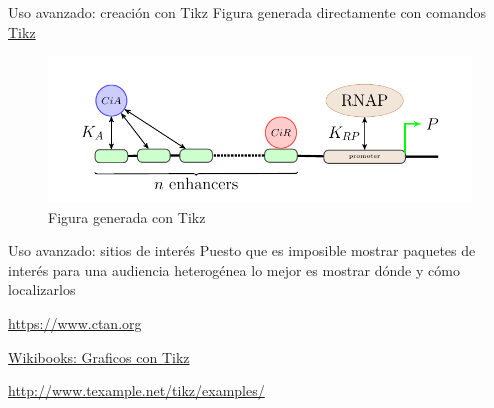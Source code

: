 \documentclass[10pt]{beamer}
\begin{document}
\begin{frame}{Uso avanzado: creación con Tikz}
Figura generada directamente con comandos \href{http://www.texample.net/tikz/examples/}{Tikz}
\begin{figure}
    \centering
    \includegraphics[scale=0.8]{graficos/bp2.pdf}
    \caption{Figura generada con Tikz}
    \label{figuraTikz}
\end{figure}
\end{frame}

\begin{frame}[fragile]{Uso avanzado: sitios de interés}
Puesto que es imposible mostrar paquetes de interés para una 
audiencia heterogénea lo mejor es mostrar dónde y cómo localizarlos

\href{https://www.ctan.org}{https://www.ctan.org}

\href{https://es.wikibooks.org/wiki/Manual_de_LaTeX/Inclusión_de_gráficos/Gráficos_con_TikZ}{Wikibooks: Graficos con Tikz}

\href{http://www.texample.net/tikz/examples/}{http://www.texample.net/tikz/examples/}

\end{frame}


\end{document}
